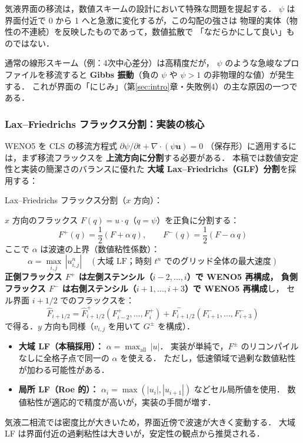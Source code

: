 気液界面の移流は，数値スキームの設計において特殊な問題を提起する．
$\psi$ は界面付近で 0 から 1 へと急激に変化するが，この勾配の強さは
物理的実体（物性の不連続）を反映したものであって，数値拡散で
「なだらかにして良い」ものではない．

通常の線形スキーム（例：4次中心差分）は高精度だが，
$\psi$ のような急峻なプロファイルを移流すると
\textbf{Gibbs 振動}（負の $\psi$ や $\psi > 1$ の非物理的な値）が発生する．
これが界面の「にじみ」（第\ref{sec:intro}章・失敗例4）の主な原因の一つである．

\subsubsection{Lax--Friedrichs フラックス分割：実装の核心}
\label{sec:lf_splitting}

WENO5 を CLS の移流方程式
$\partial\psi/\partial t + \nabla\cdot(\psi\bm{u}) = 0$
（保存形）に適用するには，まず移流フラックスを
\textbf{上流方向に分割}する必要がある．
本稿では数値安定性と実装の簡潔さのバランスに優れた
\textbf{大域 Lax--Friedrichs（GLF）分割}を採用する：

Lax--Friedrichs フラックス分割（$x$ 方向）：

$x$ 方向のフラックス $F(q) = u \cdot q$（$q = \psi$）を正負に分割する：
\begin{equation}
  F^+(q) = \frac{1}{2}(F + \alpha\, q), \qquad
  F^-(q) = \frac{1}{2}(F - \alpha\, q)
  \label{eq:lf_split}
\end{equation}
ここで $\alpha$ は波速の上界（数値粘性係数）：
\begin{equation}
  \alpha = \max_{i,j}\,|u_{i,j}^n|
  \quad (\text{大域 LF；時刻 $t^n$ でのグリッド全体の最大速度})
  \label{eq:alpha_glf}
\end{equation}
\textbf{正側フラックス $F^+$ は左側ステンシル（$i-2, \dots, i$）で WENO5 再構成，
負側フラックス $F^-$ は右側ステンシル（$i+1, \dots, i+3$）で WENO5 再構成}し，
セル界面 $i+1/2$ でのフラックスを：
\begin{equation}
  \hat{F}_{i+1/2} = \hat{F}^+_{i+1/2}(F^+_{i-2},\ldots,F^+_i)
                  + \hat{F}^-_{i+1/2}(F^-_{i+1},\ldots,F^-_{i+3})
  \label{eq:weno5_face_flux}
\end{equation}
で得る．$y$ 方向も同様（$v_{i,j}$ を用いて $G^{\pm}$ を構成）．

\begin{tcolorbox}[warnbox, title={大域 LF vs 局所 LF}]
\begin{itemize}
  \item \textbf{大域 LF（本稿採用）：} $\alpha = \max_{\mathrm{all}}\,|u|$．
    実装が単純で，$F^{\pm}$ のリコンパイルなしに全格子点で同一の $\alpha$ を使える．
    ただし，低速領域で過剰な数値粘性が加わる可能性がある．
  \item \textbf{局所 LF（Roe 的）：} $\alpha_i = \max(|u_i|, |u_{i+1}|)$ などセル局所値を使用．
    数値粘性が適応的で精度が高いが，実装の手間が増す．
\end{itemize}
気液二相流では密度比が大きいため，界面近傍で波速が大きく変動する．
大域 LF は界面付近の過剰粘性は大きいが，安定性の観点から推奨される．
\end{tcolorbox}

